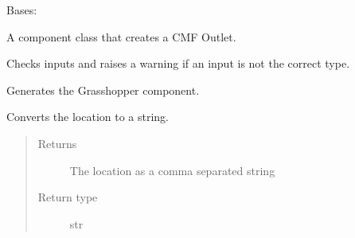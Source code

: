 \documentclass[letterpaper,10pt,english]{sphinxmanual}
\begin{document}
\begin{fulllineitems}
\label{\detokenize{cmf:livestock.components.comp_cmf.CMFOutlet}}
Bases: {\hyperref[\detokenize{superclass:livestock.components.component.GHComponent}]{}}

A component class that creates a CMF Outlet.

\begin{fulllineitems}
\label{\detokenize{cmf:livestock.components.comp_cmf.CMFOutlet.check_inputs}}
Checks inputs and raises a warning if an input is not the correct type.

\end{fulllineitems}


\begin{fulllineitems}
\label{\detokenize{cmf:livestock.components.comp_cmf.CMFOutlet.config}}
Generates the Grasshopper component.

\end{fulllineitems}


\begin{fulllineitems}
\label{\detokenize{cmf:livestock.components.comp_cmf.CMFOutlet.location_to_string}}
Converts the location to a string.
\begin{quote}\begin{description}
\item[{Returns}] \leavevmode
The location as a comma separated string

\item[{Return type}] \leavevmode
str

\end{description}\end{quote}

\end{fulllineitems}



\end{fulllineitems}
\end{document}
